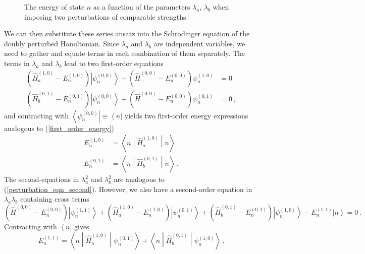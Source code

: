 \documentclass{article}
\theoremstyle{plain}\theoremheaderfont{\normalfont\itshape}\theorembodyfont{\rmfamily}\theoremseparator{.}\newtheorem*{rem}{Remark}\newtheorem*{ex}{Example}\newtheorem*{proof}{Proof}\newtheorem*{altp}{Alternative proof}
\theoremstyle{plain}\theoremheaderfont{\normalfont\bfseries}\theorembodyfont{\rmfamily}\theoremseparator{.}\newtheorem{thm}{Theorem}[section]\newtheorem{lem}[thm]{Lemma}\newtheorem{prop}[thm]{Proposition}\newtheorem*{cor}{Corollary}\newtheorem{defn}[thm]{Definition}\newtheorem{clm}[thm]{Claim}\newtheorem{clminproof}{Claim}
\theoremstyle{break}\theoremheaderfont{\normalfont\itshape}\theorembodyfont{\rmfamily}\theoremseparator{.\medskip}\newtheorem*{proofskip}{Proof}\newtheorem*{exs}{Examples}\newtheorem*{rems}{Remarks}
\theoremstyle{break}\theoremheaderfont{\normalfont\bfseries}\theorembodyfont{\rmfamily}\theoremseparator{.\medskip}\newtheorem{lemskip}[thm]{Lemma}\newtheorem{defnskip}[thm]{Definition}\newtheorem{propskip}[thm]{Proposition}\newtheorem{thmskip}[thm]{Theorem}
\numberwithin{equation}{section}
\newcommand{\bra}[1]{\left\langle #1 \right|}
\newcommand{\ket}[1]{\left| #1 \right\rangle}
\newcommand{\mel}[3]{\left\langle #1 \middle| #2 \middle| #3 \right\rangle}
\newcommand{\expval}[2]{\left\langle #2 \middle| #1 \middle| #2 \right\rangle}
\begin{document}
    \begin{figure}
        \centering
        \caption{The energy of state \(n\) as a function of the parameters \(\lambda_a\), \(\lambda_b\) when imposing two perturbations of comparable strengths.}
    \end{figure}

    We can then substitute these series ansatz into the Schr\"{o}dinger equation of the doubly perturbed Hamiltonian. Since \(\lambda_a\) and \(\lambda_b\) are independent variables, we need to gather and equate terms in each combination of them separately. The terms in \(\lambda_a\) and \(\lambda_b\) lead to two first-order equations
    \begin{align}
        (\hat{H}_a^{(1,0)}-E_n^{(1,0)})\ket{\psi_n^{(0,0)}}+(\hat{H}^{(0,0)}-E_n^{(0,0)})\psi_n^{(1,0)}&=0 \label{pertubration_a_equation}\\
        (\hat{H}_b^{(0,1)}-E_n^{(0,1)})\ket{\psi_n^{(0,0)}}+(\hat{H}^{(0,0)}-E_n^{(0,0)})\psi_n^{(0,1)}&=0\,, \label{pertubration_b_equation}
    \end{align}
    and contracting with \(\bra{\psi_n^{(0,0)}}\equiv\bra{n}\) yields two first-order energy expressions analogous to (\ref{first_order_energy})
    \begin{align}
        E_n^{(1,0)}&=\expval{\hat{H}_a^{(1,0)}}{n}\\
        E_n^{(0,1)}&=\expval{\hat{H}_b^{(0,1)}}{n}\,.
    \end{align}
    The second-equations in \(\lambda_a^2\) and \(\lambda_b^2\) are analogous to (\ref{perturbation_eqn_second}). However, we also have a second-order equation in \(\lambda_a\lambda_b\) containing cross terms
    \begin{equation}
        (\hat{H}^{(0,0)}-E_n^{(0,0)})\ket{\psi_n^{(1,1)}}+(\hat{H}_a^{(1,0)}-E_n^{(1,0)})\ket{\psi_n^{(0,1)}}+(\hat{H}_b^{(0,1)}-E_n^{(0,1)})\ket{\psi_n^{(1,0)}}-E_n^{(1,1)}\ket{n}=0\,.
    \end{equation}
    Contracting with \(\bra{n}\) gives
    \begin{equation}
        E_n^{(1,1)}=\mel{n}{\hat{H}_a^{(1,0)}}{\psi_n^{(0,1)}}+\mel{n}{\hat{H}_b^{(0,1)}}{\psi_n^{(1,0)}}\,.
    \end{equation}
\end{document}
